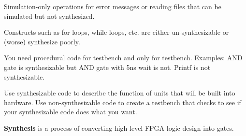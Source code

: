 Simulation-only operations for error messages or reading files that
can be simulated but not synthesized.

Constructs such as for loops, while loops, etc. are either
un-synthesizable or (worse) synthesize poorly.

You need procedural code for testbench and only for testbench.
Examples: AND gate is synthesizable but AND gate with 5ns wait is not.
Printf is not synthesizable.

Use synthesizable code to describe the function of units that will be
built into hardware. Use non-synthesizable code to create a testbench
that checks to see if your synthesizable code does what you want.

\textbf{Synthesis} is a process of converting high level
FPGA logic design into gates.


